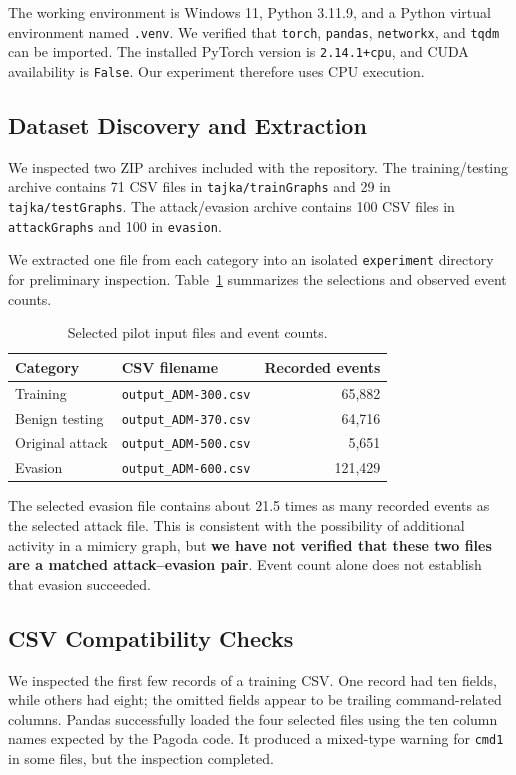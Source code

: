 \documentclass[11pt,letterpaper]{article}
\begin{document}
The working environment is Windows 11, Python 3.11.9, and a Python virtual environment named \texttt{.venv}. We verified that \texttt{torch}, \texttt{pandas}, \texttt{networkx}, and \texttt{tqdm} can be imported. The installed PyTorch version is \texttt{2.14.1+cpu}, and CUDA availability is \texttt{False}. Our experiment therefore uses CPU execution.

\subsection{Dataset Discovery and Extraction}
We inspected two ZIP archives included with the repository. The training/testing archive contains 71 CSV files in \texttt{tajka/trainGraphs} and 29 in \texttt{tajka/testGraphs}. The attack/evasion archive contains 100 CSV files in \texttt{attackGraphs} and 100 in \texttt{evasion}.

We extracted one file from each category into an isolated \texttt{experiment} directory for preliminary inspection. Table~\ref{tab:files} summarizes the selections and observed event counts.

\begin{table}[htbp]
\centering
\caption{Selected pilot input files and event counts.}
\label{tab:files}
\begin{tabular}{@{}llr@{}}
\toprule
Category & CSV filename & Recorded events \\
\midrule
Training & \texttt{output\_ADM-300.csv} & 65,882 \\
Benign testing & \texttt{output\_ADM-370.csv} & 64,716 \\
Original attack & \texttt{output\_ADM-500.csv} & 5,651 \\
Evasion & \texttt{output\_ADM-600.csv} & 121,429 \\
\bottomrule
\end{tabular}
\end{table}

The selected evasion file contains about 21.5 times as many recorded events as the selected attack file. This is consistent with the possibility of additional activity in a mimicry graph, but \textbf{we have not verified that these two files are a matched attack--evasion pair}. Event count alone does not establish that evasion succeeded.

\subsection{CSV Compatibility Checks}
We inspected the first few records of a training CSV. One record had ten fields, while others had eight; the omitted fields appear to be trailing command-related columns. Pandas successfully loaded the four selected files using the ten column names expected by the Pagoda code. It produced a mixed-type warning for \texttt{cmd1} in some files, but the inspection completed.
\end{document}
